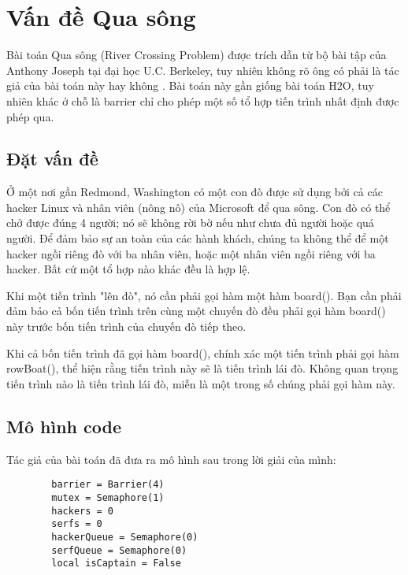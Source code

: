 \documentclass[a4paper]{article}
\begin{document}
	\pagebreak
	\section{Vấn đề Qua sông}
	Bài toán Qua sông (River Crossing Problem) được trích dẫn từ bộ bài tập của Anthony Joseph tại đại học U.C. Berkeley, 
	tuy nhiên không rõ ông có phải là tác giả của bài toán này hay không \cite{littlebook5}. Bài toán này gần giống bài toán
	H2O, tuy nhiên khác ở chỗ là barrier chỉ cho phép một số tổ hợp tiến trình nhất định được phép qua.
	
	\subsection{Đặt vấn đề}
	
	\begin{tcolorbox}
		Ở một nơi gần Redmond, Washington có một con đò được sử dụng bởi cả
		các hacker Linux và nhân viên (nông nô) của Microsoft để qua 
		sông. Con đò có thể chở được đúng 4 người; nó sẽ không rời bờ nếu như
		chưa đủ người hoặc quá người. Để đảm bảo sự an toàn của các hành khách,
		chúng ta không thể để một hacker ngồi riêng đò với ba nhân viên, hoặc một
		nhân viên ngồi riêng với ba hacker. Bất cứ một tổ hợp nào khác đều là hợp lệ.

		Khi một tiến trình "lên đò", nó cần phải gọi hàm một hàm board(). Bạn cần phải 
		đảm bảo cả bốn tiến trình trên cùng một chuyến đò đều phải gọi hàm board() này 
		trước bốn tiến trình của chuyến đò tiếp theo.

		Khi cả bốn tiến trình đã gọi hàm board(), chính xác một tiến trình phải gọi hàm 
		rowBoat(), thể hiện rằng tiến trình này sẽ là tiến trình lái đò. Không quan trọng 
		tiến trình nào là tiến trình lái đò, miễn là một trong số chúng phải gọi hàm này.
	\end{tcolorbox}
	
	\subsection{Mô hình code}

	Tác giả của bài toán đã đưa ra mô hình sau trong lời giải của mình:

	\begin{tcolorbox}
	\begin{verbatim}
		barrier = Barrier(4) 
		mutex = Semaphore(1) 
		hackers = 0 
		serfs = 0 
		hackerQueue = Semaphore(0) 
		serfQueue = Semaphore(0) 
		local isCaptain = False
	\end{verbatim}
	\end{tcolorbox}
\end{document}
